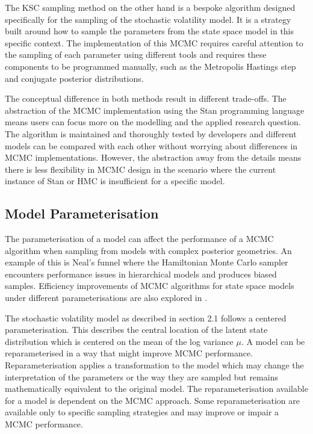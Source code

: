 \documentclass[12pt, a4paper]{article}
\begin{document}
        The KSC sampling method on the other hand is a bespoke algorithm designed specifically for the sampling of the stochastic volatility model. It is a strategy built around how to sample the parameters from the state space model in this specific context. The implementation of this MCMC requires careful attention to the sampling of each parameter using different tools and requires these components to be programmed manually, such as the Metropolis Hastings step and conjugate posterior distributions. 

        The conceptual difference in both methods result in different trade-offs. The abstraction of the MCMC implementation using the Stan programming language means users can focus more on the modelling and the applied research question. The algorithm is maintained and thoroughly tested by developers and different models can be compared with each other without worrying about differences in MCMC implementations. However, the abstraction away from the details means there is less flexibility in MCMC design in the scenario where the current instance of Stan or HMC is insufficient for a specific model.
        
    \subsection{Model Parameterisation}

        The parameterisation of a model can affect the performance of a MCMC algorithm when sampling from models with complex posterior geometries. An example of this is Neal's funnel \citep{neal2003slice} where the Hamiltonian Monte Carlo sampler encounters performance issues in hierarchical models and produces biased samples. Efficiency improvements of MCMC algorithms for state space models under different parameterisations are also explored in \citet{strickland2008parameterisation}.

        The stochastic volatility model as described in section 2.1 follows a centered parameterisation. This describes the central location of the latent state distribution which is centered on the mean of the log variance $\mu$. A model can be reparameterised in a way that might improve MCMC performance. Reparameterisation applies a transformation to the model which may change the interpretation of the parameters or the way they are sampled but remains mathematically equivalent to the original model. The reparameterisation available for a model is dependent on the MCMC approach. Some reparameterisation are available only to specific sampling strategies and may improve or impair a MCMC performance. 
\end{document}
